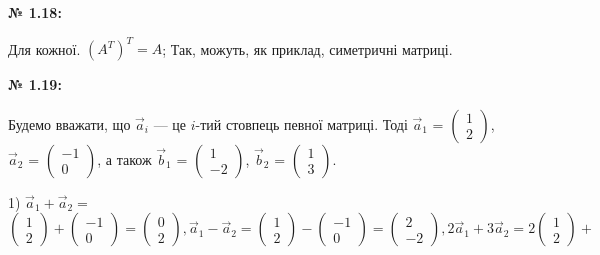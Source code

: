 \documentclass[12pt,a4paper]{article}
\begin{document}
    \vspace{1em}

    \noindent \textbf{№ 1.18:}

    Для кожної. $\displaystyle \left( A^T \right)^T = A$; Так, можуть, як приклад, симетричні матриці.

    \vspace{1em}

    \noindent \textbf{№ 1.19:}

    Будемо вважати, що $\vec{a}_i$ --- це $i$-тий стовпець певної матриці. Тоді
    $\vec{a}_1$ = \(
    \begin{pmatrix}
    1 \\
    2 
    \end{pmatrix}
    \), $\vec{a}_2$ = \(
    \begin{pmatrix}
    -1 \\
    0 
    \end{pmatrix}
    \), а також $\vec{b}_1$ = \(
    \begin{pmatrix}
    1 \\
    -2 
    \end{pmatrix}
    \), $\vec{b}_2$ = \(
    \begin{pmatrix}
    1 \\
    3 
    \end{pmatrix}
    \). 

    1) $\vec{a}_1 + \vec{a}_2 = $ \(
    \begin{pmatrix}
    1 \\
    2 
    \end{pmatrix} +
    \begin{pmatrix}
    -1 \\
    0 
    \end{pmatrix}
     = \begin{pmatrix}
    0 \\
    2 
    \end{pmatrix},
    \vec{a}_1 - \vec{a}_2 = \begin{pmatrix}
    1 \\
    2 
    \end{pmatrix} -
    \begin{pmatrix}
    -1 \\
    0 
    \end{pmatrix}
     = \begin{pmatrix}
    2 \\
    -2 
    \end{pmatrix}
    ,
    2\vec{a}_1 + 3\vec{a}_2 = 2\begin{pmatrix}
    1 \\
    2 
    \end{pmatrix}+
    \)
\end{document}
